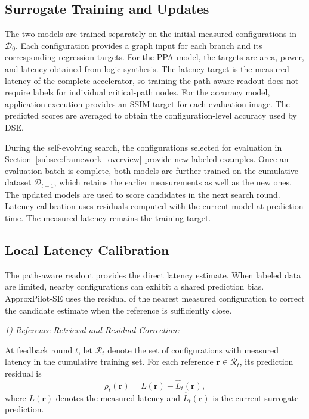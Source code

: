 \subsection{Surrogate Training and Updates}
\label{subsec:surrogate_training}

The two models are trained separately on the initial measured configurations in $\mathcal{D}_0$. Each configuration provides a graph input for each branch and its corresponding regression targets. For the PPA model, the targets are area, power, and latency obtained from logic synthesis. The latency target is the measured latency of the complete accelerator, so training the path-aware readout does not require labels for individual critical-path nodes. For the accuracy model, application execution provides an SSIM target for each evaluation image. The predicted scores are averaged to obtain the configuration-level accuracy used by DSE.

During the self-evolving search, the configurations selected for evaluation in Section~\ref{subsec:framework_overview} provide new labeled examples. Once an evaluation batch is complete, both models are further trained on the cumulative dataset $\mathcal{D}_{t+1}$, which retains the earlier measurements as well as the new ones. The updated models are used to score candidates in the next search round. Latency calibration uses residuals computed with the current model at prediction time. The measured latency remains the training target.

\subsection{Local Latency Calibration}
\label{subsec:local_latency_calibration}

The path-aware readout provides the direct latency estimate. When labeled data are limited, nearby configurations can exhibit a shared prediction bias. ApproxPilot-SE uses the residual of the nearest measured configuration to correct the candidate estimate when the reference is sufficiently close.

\noindent\textit{1) Reference Retrieval and Residual Correction:}

At feedback round $t$, let $\mathcal{R}_t$ denote the set of configurations with measured latency in the cumulative training set. For each reference $\mathbf{r}\in\mathcal{R}_t$, its prediction residual is
\begin{equation}
    \rho_t(\mathbf{r})
    =
    L(\mathbf{r})
    -
    \widehat L_t(\mathbf{r}),
    \label{eq:se_reference_residual}
\end{equation}
where $L(\mathbf{r})$ denotes the measured latency and $\widehat L_t(\mathbf{r})$ is the current surrogate prediction.

